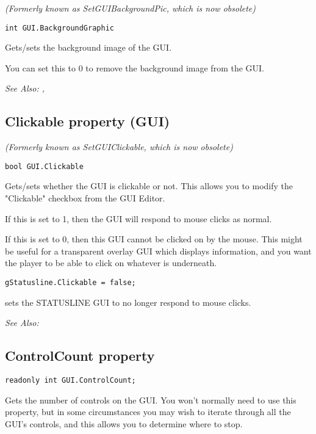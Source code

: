 \it{(Formerly known as SetGUIBackgroundPic, which is now obsolete)}

\begin{verbatim}
int GUI.BackgroundGraphic
\end{verbatim}
Gets/sets the background image of the GUI.

You can set this to 0 to remove the background image from the GUI.

\it{See Also:} ,



\subsection{Clickable property (GUI)}\label{GUI.Clickable}%

\it{(Formerly known as SetGUIClickable, which is now obsolete)}

\begin{verbatim}
bool GUI.Clickable
\end{verbatim}
Gets/sets whether the GUI is clickable or not. This allows you to modify the "Clickable"
checkbox from the GUI Editor.

If this is set to 1, then the GUI will respond to mouse clicks as normal.

If this is set to 0, then this GUI cannot be clicked on by the mouse. This might be
useful for a transparent overlay GUI which displays information, and you want the
player to be able to click on whatever is underneath.

\begin{verbatim}
gStatusline.Clickable = false;
\end{verbatim}
sets the STATUSLINE GUI to no longer respond to mouse clicks.

\it{See Also:} 


\subsection{ControlCount property}\label{GUI.ControlCount}%

\begin{verbatim}
readonly int GUI.ControlCount;
\end{verbatim}
Gets the number of controls on the GUI. You won't normally need to use this property,
but in some circumstances you may wish to iterate through all the GUI's controls,
and this allows you to determine where to stop.

